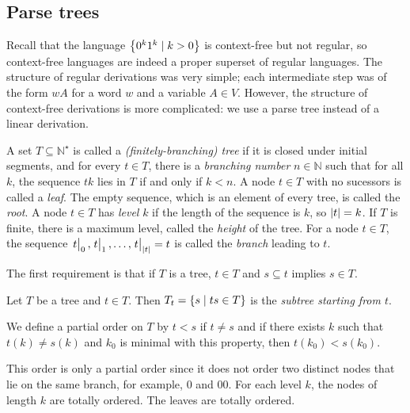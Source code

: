 \subsection{Parse trees}
Recall that the language \( \qty{0^k1^k \mid k > 0} \) is context-free but not regular, so context-free languages are indeed a proper superset of regular languages.
The structure of regular derivations was very simple; each intermediate step was of the form \( wA \) for a word \( w \) and a variable \( A \in V \).
However, the structure of context-free derivations is more complicated: we use a parse tree instead of a linear derivation.
\begin{definition}
	A set \( T \subseteq \mathbb N^\star \) is called a \emph{(finitely-branching) tree} if it is closed under initial segments, and for every \( t \in T \), there is a \emph{branching number} \( n \in \mathbb N \) such that for all \( k \), the sequence \( tk \) lies in \( T \) if and only if \( k < n \).
	A node \( t \in T \) with no sucessors is called a \emph{leaf}.
	The empty sequence, which is an element of every tree, is called the \emph{root}.
	A node \( t \in T \) has \emph{level} \( k \) if the length of the sequence is \( k \), so \( \abs{t} = k \).
	If \( T \) is finite, there is a maximum level, called the \emph{height} of the tree.
	For a node \( t \in T \), the sequence \( \eval{t}_0, \eval{t}_1, \dots, \eval{t}_{\abs{t}} = t \) is called the \emph{branch} leading to \( t \).
\end{definition}
\begin{remark}
	The first requirement is that if \( T \) is a tree, \( t \in T \) and \( s \subseteq t \) implies \( s \in T \).
\end{remark}
\begin{example}
\end{example}
\begin{definition}
	Let \( T \) be a tree and \( t \in T \).
	Then \( T_t = \qty{s \mid ts \in T} \) is the \emph{subtree starting from \( t \)}.
\end{definition}
\begin{definition}
	We define a partial order on \( T \) by \( t < s \) if \( t \neq s \) and if there exists \( k \) such that \( t(k) \neq s(k) \) and \( k_0 \) is minimal with this property, then \( t(k_0) < s(k_0) \).
\end{definition}
\begin{remark}
	This order is only a partial order since it does not order two distinct nodes that lie on the same branch, for example, \( 0 \) and \( 00 \).
	For each level \( k \), the nodes of length \( k \) are totally ordered.
	The leaves are totally ordered.
\end{remark}

